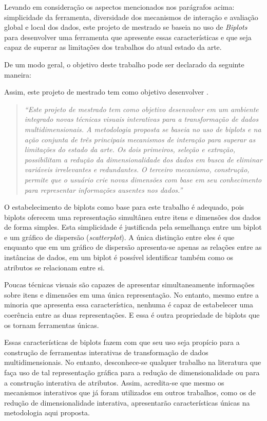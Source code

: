 Levando em consideração os aspectos mencionados nos
parágrafos acima: simplicidade da ferramenta, diversidade
dos mecanismos de interação e avaliação global e local dos
dados, este projeto de mestrado se baseia no uso de
\emph{Biplots}~\cite{Gabriel1971} para desenvolver uma
ferramenta que apresente essas características e que seja
capaz de superar as limitações dos trabalhos do atual estado
da arte.

De um modo geral, o objetivo deste trabalho pode ser
declarado da seguinte maneira:


Assim, este projeto de mestrado tem como objetivo
desenvolver .

\begin{quote} \emph{``Este projeto de mestrado tem como
        objetivo desenvolver em um ambiente integrado novas
        técnicas visuais interativas para a transformação de
        dados multidimensionais. A metodologia proposta se
        baseia no uso de biplots e na ação conjunta de três
        principais mecanismos de interação para superar as
        limitações do estado da arte.  Os dois primeiros,
        seleção e extração, possibilitam a redução da
        dimensionalidade dos dados em busca de eliminar
        variáveis irrelevantes e redundantes. O terceiro
        mecanismo, construção, permite que o usuário crie
        novas dimensões com base em seu conhecimento para
        representar informações ausentes nos dados.''}
\end{quote}

O estabelecimento de biplots como base para este trabalho é
adequado, pois biplots oferecem uma representação simultânea
entre itens e dimensões dos dados de forma simples. Esta
simplicidade é justificada pela semelhança entre um biplot e
um gráfico de dispersão (\emph{scatterplot}). A única
distinção entre eles é que enquanto que em um gráfico
de dispersão apresenta-se apenas as relações entre as
instâncias de dados, em um biplot é possível identificar também
como os atributos se relacionam entre si. 

Poucas técnicas visuais são capazes de apresentar
simultaneamente informações sobre itens e dimensões em uma
única representação. No entanto, mesmo entre a minoria que
apresenta essa característica, nenhuma é capaz de
estabelecer uma coerência entre as duas representações. E
essa é outra propriedade de biplots que os tornam
ferramentas únicas.

Essas características de biplots fazem com que seu uso seja
propício para a construção de ferramentas interativas de
transformação de dados multidimensionais. No entanto,
desconhece-se qualquer trabalho na literatura que faça uso
de tal representação gráfica para a redução de
dimensionalidade ou para a construção interativa de
atributos. Assim, acredita-se que mesmo os mecanismos
interativos que já foram utilizados em outros trabalhos,
como os de redução de dimensionalidade interativa,
apresentarão características únicas na metodologia aqui
proposta.

